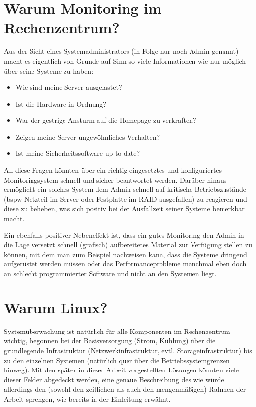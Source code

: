 \documentclass[12pt,a4paper,parskip,listof=totoc,bibliography=totoc]{scrreprt}
\begin{document}
	\section{Warum Monitoring im Rechenzentrum?}
	Aus der Sicht eines Systemadministrators (in Folge nur noch Admin genannt) macht es eigentlich von Grunde auf Sinn so viele Informationen wie nur möglich über seine Systeme zu haben:
	\begin{itemize}
		\item Wie sind meine Server ausgelastet?
		\item Ist die Hardware in Ordnung?
		\item War der gestrige Ansturm auf die Homepage zu verkraften?
		\item Zeigen meine Server ungewöhnliches Verhalten?
		\item Ist meine Sicherheitssoftware up to date?
	\end{itemize}
	  All diese Fragen könnten über ein richtig eingesetztes und konfiguriertes Monitoringsystem schnell und sicher beantwortet werden. Darüber hinaus ermöglicht ein solches System dem Admin schnell auf kritische Betriebszustände (\acrlong{bspw} Netzteil im Server oder Festplatte im RAID ausgefallen) zu reagieren und diese zu beheben, was sich positiv bei der Ausfallzeit seiner Systeme bemerkbar macht. 
	  
	  Ein ebenfalls positiver Nebeneffekt ist, dass ein gutes Monitoring den Admin in die Lage versetzt schnell (grafisch) aufbereitetes Material zur Verfügung stellen zu können, mit dem man zum Beispiel nachweisen kann, dass die Systeme dringend aufgerüstet werden müssen oder das Performanceprobleme manchmal eben doch an schlecht programmierter Software und nicht an den Systemen liegt.
	  
	\section{Warum Linux?}
	Systemüberwachung ist natürlich für alle Komponenten im Rechenzentrum wichtig, begonnen bei der Basisversorgung (Strom, Kühlung) über die grundlegende Infrastruktur (Netzwerkinfrastruktur, evtl. Storageinfrastruktur) bis zu den einzelnen Systemen (natürlich quer über die Betriebssystemgrenzen hinweg). Mit den später in dieser Arbeit vorgestellten Lösungen könnten viele dieser Felder abgedeckt werden, eine genaue Beschreibung des wie würde allerdings den (sowohl den zeitlichen als auch den mengenmäßigen) Rahmen der Arbeit sprengen, wie bereits in der Einleitung erwähnt. 
	
\end{document}
